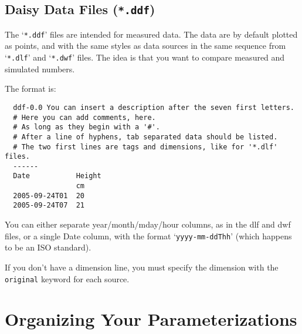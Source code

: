 \documentclass[a4paper]{article}
\begin{document}
\subsection{Daisy Data Files (\texttt{*.ddf})}

The `\texttt{*.ddf}' files are intended for measured data.  The data
are by default plotted as points, and with the same styles as data
sources in the same sequence from `\texttt{*.dlf}' and
`\texttt{*.dwf}' files.  The idea is that you want to compare measured
and simulated numbers.

The format is:
\begin{verbatim}
  ddf-0.0 You can insert a description after the seven first letters.
  # Here you can add comments, here.
  # As long as they begin with a '#'.
  # After a line of hyphens, tab separated data should be listed.
  # The two first lines are tags and dimensions, like for '*.dlf' files.
  ------
  Date           Height
                 cm
  2005-09-24T01  20
  2005-09-24T07  21
\end{verbatim}
You can either separate year/month/mday/hour columns, as in the dlf
and dwf files, or a single Date column, with the format
`\texttt{yyyy-mm-ddThh}' (which happens to be an ISO standard).

If you don't have a dimension line, you must specify the dimension
with the \texttt{original} keyword for each source.

\section{Organizing Your Parameterizations}
\label{sec:files}
\end{document}
